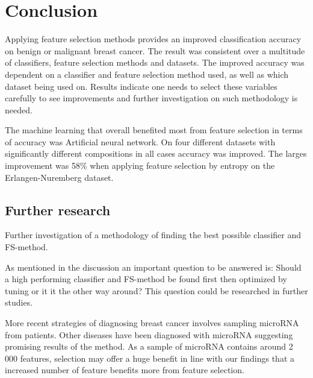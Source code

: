 \chapter{Conclusion}




Applying feature selection methods provides an improved classification accuracy on benign or malignant breast cancer. The result was consistent over a multitude of classifiers, feature selection methods and datasets. The improved accuracy was dependent on a classifier and feature selection method used, as well as which dataset being used on. Results indicate one needs to select these variables carefully to see improvements and further investigation on such methodology is needed.


The machine learning that overall benefited most from feature selection in terms of accuracy was Artificial neural network. On four different datasets with significantly different compositions in all cases accuracy was improved. The larges improvement was 58\% when applying feature selection by entropy on the Erlangen-Nuremberg dataset.


\section{Further research}

Further investigation of a methodology of finding the best possible classifier and FS-method.

As mentioned in the discussion an important question to be answered is: Should a high performing classifier and FS-method be found first then optimized by tuning or it it the other way around? This question could be researched in further studies. 

More recent strategies of diagnosing breast cancer involves sampling microRNA from patients. Other diseases have been diagnosed with microRNA suggesting promising results of the method. As a sample of microRNA contains around 2 000 features, selection may offer a huge benefit in line with our findings that a increased number of feature benefits more from feature selection.
